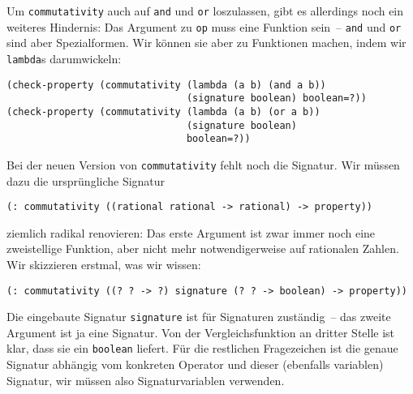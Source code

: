 Um \lstinline{commutativity} auch auf \lstinline{and} und \lstinline{or}
loszulassen, gibt es allerdings noch ein weiteres Hindernis: Das
Argument zu \lstinline{op} muss eine Funktion sein~-- \lstinline{and} und
\lstinline{or} sind aber Spezialformen.  Wir können sie aber zu
Funktionen machen, indem wir \lstinline{lambda}s darumwickeln:
%
\begin{lstlisting}
(check-property (commutativity (lambda (a b) (and a b))
                               (signature boolean) boolean=?))
(check-property (commutativity (lambda (a b) (or a b))
                               (signature boolean)
                               boolean=?))
\end{lstlisting}
%
Bei der neuen Version von \lstinline{commutativity} fehlt noch die
Signatur.  Wir müssen dazu die ursprüngliche Signatur
%
\begin{lstlisting}
(: commutativity ((rational rational -> rational) -> property))
\end{lstlisting}
%
ziemlich radikal renovieren: Das erste Argument ist zwar immer noch
eine zweistellige Funktion, aber nicht mehr notwendigerweise auf
rationalen Zahlen.  Wir skizzieren erstmal, was wir wissen:
%
\begin{lstlisting}
(: commutativity ((? ? -> ?) signature (? ? -> boolean) -> property))
\end{lstlisting}
%
Die eingebaute Signatur \lstinline{signature} ist für Signaturen
zuständig~-- das zweite Argument ist ja eine Signatur.  Von der
Vergleichsfunktion an dritter Stelle ist klar, dass sie ein
\lstinline{boolean} liefert.  Für die restlichen Fragezeichen ist die
genaue Signatur abhängig vom konkreten Operator und dieser (ebenfalls
variablen) Signatur, wir müssen also Signaturvariablen verwenden.

